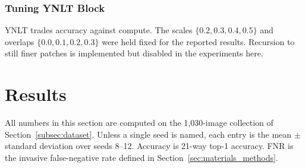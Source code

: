 \documentclass[final,3p,times,twocolumn]{elsarticle}
\begin{document}
\subsubsection{Tuning YNLT Block}
YNLT trades accuracy against compute. The scales \(\{0.2,0.3,0.4,0.5\}\) and overlaps \(\{0.0,0.1,0.2,0.3\}\) were held fixed for the reported results. Recursion to still finer patches is implemented but disabled in the experiments here.








\section{Results}
\label{sec:results}

All numbers in this section are computed on the 1{,}030-image collection of Section~\ref{subsec:dataset}. Unless a single seed is named, each entry is the mean \(\pm\) standard deviation over seeds 8--12. Accuracy is 21-way top-1 accuracy. FNR is the invasive false-negative rate defined in Section~\ref{sec:materials_methods}.
\end{document}
